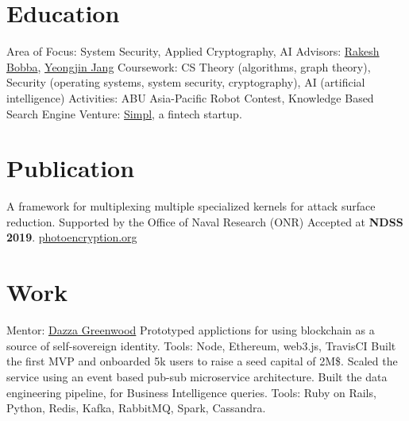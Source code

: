 \documentclass[11pt,a4paper,sans]{moderncv}
\begin{document}
\makecvtitle

\section{Education}
{
    Area of Focus: System Security, Applied Cryptography, AI\newline{}
    Advisors:
    \href{https://eecs.oregonstate.edu/people/bobba-rakesh}{Rakesh Bobba},
    \href{https://www.unexploitable.systems/}{Yeongjin Jang}\newline{}
    Coursework: CS Theory (algorithms, graph theory), Security (operating systems, system security, cryptography), AI (artificial intelligence)\newline{}
}
{
    Activities:
    ABU Asia-Pacific Robot Contest, Knowledge Based Search Engine\newline{}
    Venture: \href{https://www.getsimpl.com}{Simpl}, a fintech startup.
}

\section{Publication}
{
    A framework for multiplexing multiple specialized kernels for attack surface reduction.\newline{}
    Supported by the Office of Naval Research (ONR)\newline{}
}
{
    Accepted at \textbf{NDSS 2019}. \href{https://photoencryption.org}{photoencryption.org}
}

\section{Work}
{
    Mentor: \href{https://web.media.mit.edu/~dang/}{Dazza Greenwood}\newline{}
    Prototyped applictions for using blockchain as a source of self-sovereign identity.\newline{}
    Tools: Node, Ethereum, web3.js, TravisCI
}
{
    Built the first MVP and onboarded 5k users to raise a seed capital of 2M\$.\newline{}
    Scaled the service using an event based pub-sub microservice architecture.\newline{}
    Built the data engineering pipeline, for Business Intelligence queries.\newline{}
    Tools: Ruby on Rails, Python, Redis, Kafka, RabbitMQ, Spark, Cassandra.
}
\end{document}
